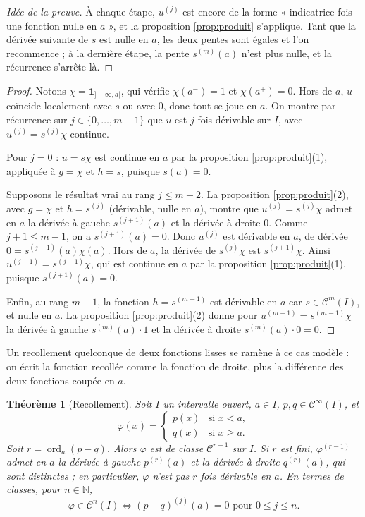 \documentclass[11pt,a4paper]{article}
\theoremstyle{plain}
\newtheorem{theoreme}{Théorème}[section]
\theoremstyle{definition}
\theoremstyle{remark}
\newcommand{\N}{\mathbb{N}}
\newcommand{\Cc}{\mathcal{C}}
\newcommand{\1}{\mathbf{1}}
\DeclareMathOperator{\ord}{ord}
\begin{document}
\begin{proof}[Idée de la preuve]
À chaque étape, $u^{(j)}$ est encore de la forme « indicatrice fois une fonction nulle en $a$ », et la proposition \ref{prop:produit} s'applique. Tant que la dérivée suivante de $s$ est nulle en $a$, les deux pentes sont égales et l'on recommence ; à la dernière étape, la pente $s^{(m)}(a)$ n'est plus nulle, et la récurrence s'arrête là.
\end{proof}

\begin{proof}
Notons $\chi=\1_{]-\infty,a[}$, qui vérifie $\chi(a^-)=1$ et $\chi(a^+)=0$. Hors de $a$, $u$ coïncide localement avec $s$ ou avec $0$, donc tout se joue en $a$. On montre par récurrence sur $j\in\{0,\dots,m-1\}$ que $u$ est $j$ fois dérivable sur $I$, avec $u^{(j)}=s^{(j)}\chi$ continue.

Pour $j=0$ : $u=s\chi$ est continue en $a$ par la proposition \ref{prop:produit}(1), appliquée à $g=\chi$ et $h=s$, puisque $s(a)=0$.

Supposons le résultat vrai au rang $j\leq m-2$. La proposition \ref{prop:produit}(2), avec $g=\chi$ et $h=s^{(j)}$ (dérivable, nulle en $a$), montre que $u^{(j)}=s^{(j)}\chi$ admet en $a$ la dérivée à gauche $s^{(j+1)}(a)$ et la dérivée à droite $0$. Comme $j+1\leq m-1$, on a $s^{(j+1)}(a)=0$. Donc $u^{(j)}$ est dérivable en $a$, de dérivée $0=s^{(j+1)}(a)\chi(a)$. Hors de $a$, la dérivée de $s^{(j)}\chi$ est $s^{(j+1)}\chi$. Ainsi $u^{(j+1)}=s^{(j+1)}\chi$, qui est continue en $a$ par la proposition \ref{prop:produit}(1), puisque $s^{(j+1)}(a)=0$.

Enfin, au rang $m-1$, la fonction $h=s^{(m-1)}$ est dérivable en $a$ car $s\in\Cc^m(I)$, et nulle en $a$. La proposition \ref{prop:produit}(2) donne pour $u^{(m-1)}=s^{(m-1)}\chi$ la dérivée à gauche $s^{(m)}(a)\cdot1$ et la dérivée à droite $s^{(m)}(a)\cdot0=0$.
\end{proof}

Un recollement quelconque de deux fonctions lisses se ramène à ce cas modèle : on écrit la fonction recollée comme la fonction de droite, plus la différence des deux fonctions coupée en $a$.

\begin{theoreme}[Recollement]\label{thm:recollement}
Soit $I$ un intervalle ouvert, $a\in I$, $p,q\in\Cc^\infty(I)$, et
\[
  \varphi(x)=\begin{cases} p(x) & \text{si } x<a,\\ q(x) & \text{si } x\geq a.\end{cases}
\]
Soit $r=\ord_a(p-q)$. Alors $\varphi$ est de classe $\Cc^{r-1}$ sur $I$. Si $r$ est fini, $\varphi^{(r-1)}$ admet en $a$ la dérivée à gauche $p^{(r)}(a)$ et la dérivée à droite $q^{(r)}(a)$, qui sont distinctes ; en particulier, $\varphi$ n'est pas $r$ fois dérivable en $a$. En termes de classes, pour $n\in\N$,
\[
  \varphi\in\Cc^n(I)\iff (p-q)^{(j)}(a)=0 \text{ pour } 0\leq j\leq n .
\]
\end{theoreme}
\end{document}
